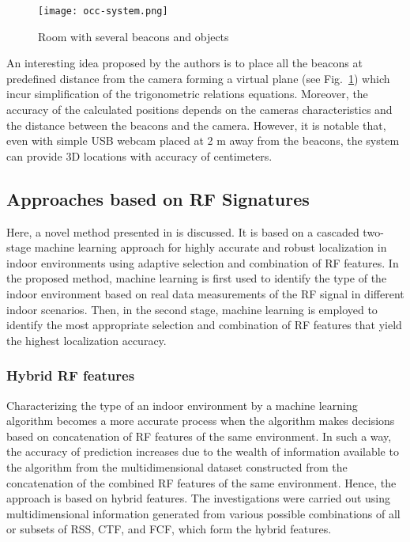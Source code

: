     \begin{figure}[H]
    	\captionsetup{justification=centering}
    	\texttt{[image: occ-system.png]}
    	\caption{Room with several beacons and objects \cite[Fig. 1(a)]{occ-burbano}}
    	\label{fig:occ-burbano}
    \end{figure}
    
    An interesting idea proposed by the authors is to place all the beacons at predefined distance from the camera forming a virtual plane (see Fig.~\ref{fig:occ-burbano}) which incur simplification of the trigonometric relations equations. Moreover, the accuracy of the calculated positions depends on the cameras characteristics and the distance between the beacons and the camera. However, it is notable that, even with simple USB webcam placed at 2 m away from the beacons, the system can provide 3D locations with accuracy of centimeters. 

\subsection{Approaches based on RF Signatures}

    Here, a novel method presented in \cite{cascade} is discussed. It is based on a cascaded two-stage machine learning approach for highly accurate and robust localization in indoor environments using adaptive selection and combination of RF features. In the proposed method, machine learning is first used to identify the type of the indoor environment based on real data measurements of the RF signal in different indoor scenarios. Then, in the second stage, machine learning is employed to identify the most appropriate selection and combination of RF features that yield the highest localization accuracy.

    \subsubsection{Hybrid RF features}
    Characterizing the type of an indoor environment by a machine learning algorithm becomes a more accurate process when the algorithm makes decisions based on concatenation of RF features of the same environment. In such a way, the accuracy of prediction increases due to the wealth of information available to the algorithm from the multidimensional dataset constructed from the concatenation of the combined RF features of the same environment. Hence, the approach is based on hybrid features. The investigations were carried out using multidimensional information generated from various possible combinations of all or subsets of RSS, CTF, and FCF, which form the hybrid features.
    
